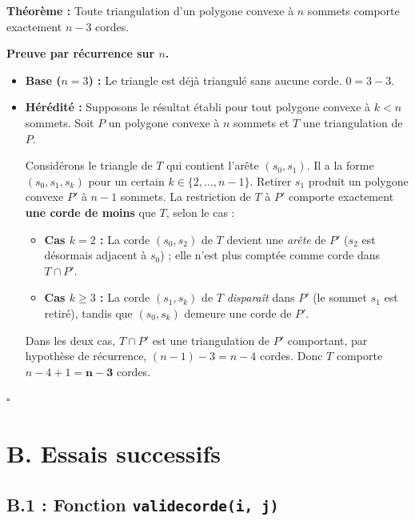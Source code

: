 \documentclass[12pt,a4paper]{article}
\begin{document}
\textbf{Théorème :} Toute triangulation d'un polygone convexe à $n$ sommets comporte
exactement $n - 3$ cordes.

\textbf{Preuve par récurrence sur $n$.}

\begin{itemize}
  \item \textbf{Base ($n = 3$) :} Le triangle est déjà triangulé sans aucune corde.
        $0 = 3 - 3$.

  \item \textbf{Hérédité :} Supposons le résultat établi pour tout polygone convexe
        à $k < n$ sommets.  Soit $P$ un polygone convexe à $n$ sommets et $T$ une
        triangulation de $P$.

        Considérons le triangle de $T$ qui contient l'arête $(s_0, s_1)$. Il a la forme
        $(s_0, s_1, s_k)$ pour un certain $k \in \{2, \ldots, n-1\}$. Retirer $s_1$
        produit un polygone convexe $P'$ à $n-1$ sommets. La restriction de $T$ à $P'$
        comporte exactement \textbf{une corde de moins} que $T$, selon le cas :
        \begin{itemize}
          \item \textbf{Cas $k = 2$ :} La corde $(s_0, s_2)$ de $T$ devient une
                \emph{arête} de $P'$ ($s_2$ est désormais adjacent à $s_0$) ; elle
                n'est plus comptée comme corde dans $T \cap P'$.
          \item \textbf{Cas $k \geq 3$ :} La corde $(s_1, s_k)$ de $T$ \emph{disparaît}
                dans $P'$ (le sommet $s_1$ est retiré), tandis que $(s_0, s_k)$ demeure
                une corde de $P'$.
        \end{itemize}
        Dans les deux cas, $T \cap P'$ est une triangulation de $P'$ comportant,
        par hypothèse de récurrence, $(n-1)-3 = n-4$ cordes. Donc $T$ comporte
        $n - 4 + 1 = \mathbf{n-3}$ cordes.
\end{itemize}

\hfill$\square$

\section{B. Essais successifs}

\subsection{B.1 : Fonction \texttt{validecorde(i, j)}}
\end{document}
